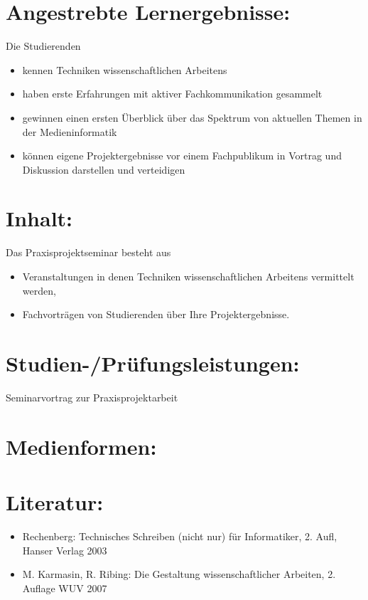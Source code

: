 \section{Angestrebte
Lernergebnisse:}\label{angestrebte-lernergebnisse-19}

Die Studierenden

\begin{itemize}
\item
  kennen Techniken wissenschaftlichen Arbeitens
\item
  haben erste Erfahrungen mit aktiver Fachkommunikation gesammelt
\item
  gewinnen einen ersten Überblick über das Spektrum von aktuellen Themen
  in der Medieninformatik
\item
  können eigene Projektergebnisse vor einem Fachpublikum in Vortrag und
  Diskussion darstellen und verteidigen
\end{itemize}

\section{Inhalt:}\label{inhalt-19}

Das Praxisprojektseminar besteht aus

\begin{itemize}
\item
  Veranstaltungen in denen Techniken wissenschaftlichen Arbeitens
  vermittelt werden,
\item
  Fachvorträgen von Studierenden über Ihre Projektergebnisse.
\end{itemize}

\section{Studien-/Prüfungsleistungen:}\label{studien-pruxfcfungsleistungen-19}

Seminarvortrag zur Praxisprojektarbeit

\section{Medienformen:}\label{medienformen-19}

\section{Literatur:}\label{literatur-19}

\begin{itemize}
\item
  Rechenberg: Technisches Schreiben (nicht nur) für Informatiker, 2.
  Aufl, Hanser Verlag 2003
\item
  M. Karmasin, R. Ribing: Die Gestaltung wissenschaftlicher Arbeiten, 2.
  Auflage WUV 2007
\end{itemize}

